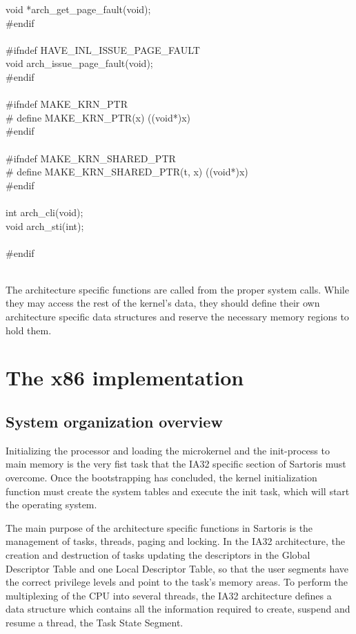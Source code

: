 \documentclass[11pt, letterpaper, twoside, english]{book}
\begin{document}
\begin{sf}
void *arch\_get\_page\_fault(void); \\
\#endif \\
\\
\#ifndef HAVE\_INL\_ISSUE\_PAGE\_FAULT \\
void arch\_issue\_page\_fault(void); \\
\#endif \\
\\
\#ifndef MAKE\_KRN\_PTR \\
\# define MAKE\_KRN\_PTR(x) ((void*)x) \\
\#endif \\
\\
\#ifndef MAKE\_KRN\_SHARED\_PTR \\
\# define MAKE\_KRN\_SHARED\_PTR(t, x) ((void*)x) \\
\#endif \\
\\
int arch\_cli(void); \\
void arch\_sti(int); \\
\\
\#endif \\
\end{sf}
\\
The architecture specific functions are called from the proper system calls. While they may access the rest of the kernel's data, they should define their own architecture specific data structures and reserve the necessary memory regions to hold them. 

\chapter{The x86 implementation}

\section{System organization overview}
Initializing the processor and loading the microkernel and the init-process to main memory is the very fist task that the IA32 specific section of Sartoris must overcome. Once the bootstrapping has concluded, the kernel initialization function must create the system tables and execute the init task, which will start the operating system. 

The main purpose of the architecture specific functions in Sartoris is the management of tasks, threads, paging and locking. In the IA32 architecture, the creation and destruction of tasks updating the descriptors in the Global Descriptor Table and one Local Descriptor Table, so that the user segments have the correct privilege levels and point to the task's memory areas. To perform the multiplexing of the CPU into several threads, the IA32 architecture defines a data structure which contains all the information required to create, suspend and resume a thread, the Task State Segment.
\end{document}
